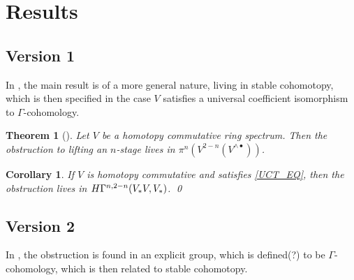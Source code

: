 \documentclass[11pt,reqno
,draft
]{amsart}
\numberwithin{equation}{section}
\numberwithin{figure}{section}
\newtheorem{theorem}[equation]{Theorem}%
\newtheorem{corollary}[equation]{Corollary}%
\theoremstyle{definition} %
\begin{document}
\section{Results}

\subsection{Version 1}

In \cite{Rob18}, the main result is of a more general nature, living in stable cohomotopy, which is then specified in the case $V$ satisfies a universal coefficient isomorphism to $\Gamma$-cohomology.

\begin{theorem}[{\cite[Thm. 4.13]{Rob18}}]
        Let $V$ be a homotopy commutative ring spectrum.
        Then the obstruction to lifting an $n$-stage lives in $\pi^n \left( V^{2-n}(V^{\wedge \bullet}) \right)$. 
\end{theorem}

\begin{corollary}
        If $V$ is homotopy commutative and satisfies \cref{UCT_EQ}, then the obstruction lives in
        $H \Gamma^{n, 2-n}(V_{\**} V, V_{\**})$. \qed
\end{corollary}

\subsection{Version 2}

In \cite{Rob03}, the obstruction is found in an explicit group, which is defined(?) to be $\Gamma$-cohomology, which is then related to stable cohomotopy.
\end{document}
